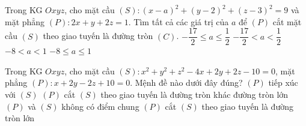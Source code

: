\begin{ex}%
	Trong KG $Oxyz$, cho mặt cầu $(S)\colon(x-a)^2+(y-2)^2+(z-3)^2=9$ và mặt phẳng $(P)\colon 2x+y+2z=1$. Tìm tất cả các giá trị của $a$ để $(P)$ cắt mặt cầu $(S)$ theo giao tuyến là đường tròn $(C)$.
	\choice
	{$-\dfrac{17}{2}\leq a\leq \dfrac{1}{2}$}
	{$-\dfrac{17}{2}<a<\dfrac{1}{2}$}
	{\True $-8<a<1$}
	{$-8\leq a\leq 1$}
\end{ex}

\begin{ex}%
	Trong KG $Oxyz$, cho mặt cầu $(S)\colon x^2+y^2+z^2-4 x+2 y+2 z-10=0$, mặt phẳng $(P)\colon x+2 y-2 z+10=0$. Mệnh đề nào dưới đây đúng?
	\choice
	{\True $(P)$ tiếp xúc với $(S)$}
	{$(P)$ cắt $(S)$ theo giao tuyến là đường tròn khác đường tròn lớn}
	{$(P)$ và $(S)$ không có điểm chung}
	{$(P)$ cắt $(S)$ theo giao tuyến là đường tròn lớn}
\end{ex}

